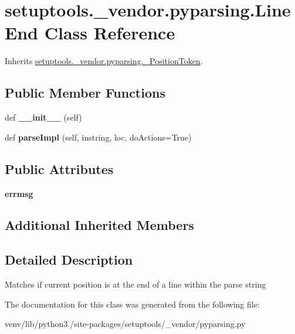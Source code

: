 \hypertarget{classsetuptools_1_1__vendor_1_1pyparsing_1_1_line_end}{}\section{setuptools.\+\_\+vendor.\+pyparsing.\+Line\+End Class Reference}
\label{classsetuptools_1_1__vendor_1_1pyparsing_1_1_line_end}


Inherits \hyperlink{classsetuptools_1_1__vendor_1_1pyparsing_1_1___position_token}{setuptools.\+\_\+vendor.\+pyparsing.\+\_\+\+Position\+Token}.

\subsection*{Public Member Functions}
\begin{DoxyCompactItemize}
\item 
\mbox{\label{classsetuptools_1_1__vendor_1_1pyparsing_1_1_line_end_a30f30dad80c5899ee902627b2c1e402c}} 
def {\bfseries \+\_\+\+\_\+init\+\_\+\+\_\+} (self)
\item 
\mbox{\label{classsetuptools_1_1__vendor_1_1pyparsing_1_1_line_end_ad02d3a244791f44da87eb59efbfdaa91}} 
def {\bfseries parse\+Impl} (self, instring, loc, do\+Actions=True)
\end{DoxyCompactItemize}
\subsection*{Public Attributes}
\begin{DoxyCompactItemize}
\item 
\mbox{\label{classsetuptools_1_1__vendor_1_1pyparsing_1_1_line_end_a17e435f83fa54c889ae9082c86e23280}} 
{\bfseries errmsg}
\end{DoxyCompactItemize}
\subsection*{Additional Inherited Members}


\subsection{Detailed Description}
\begin{DoxyVerb}Matches if current position is at the end of a line within the parse string
\end{DoxyVerb}
 

The documentation for this class was generated from the following file\+:\begin{DoxyCompactItemize}
\item 
venv/lib/python3./site-\/packages/setuptools/\+\_\+vendor/pyparsing.\+py\end{DoxyCompactItemize}
